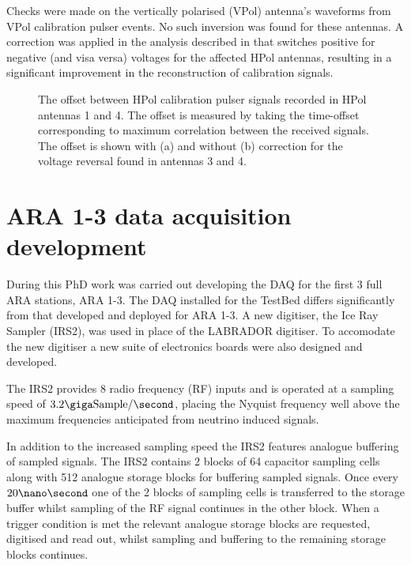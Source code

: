 Checks were made on the vertically polarised (VPol) antenna's waveforms from VPol calibration pulser events. No such inversion was found for these antennas. A correction was applied in the analysis described in  that switches positive for negative (and visa versa) voltages for the affected HPol antennas, resulting in a significant improvement in the reconstruction of calibration signals. 

\begin{figure}[htpb]
  \hfill
\caption{The offset between HPol calibration pulser signals recorded in HPol antennas 1 and 4. The offset is measured by taking the time-offset corresponding to maximum correlation between the received signals. The offset is shown with (a) and without (b) correction for the voltage reversal found in antennas 3 and 4.}
\label{fig:calibration:Voltage-Reversal-DeltaT}
\end{figure}



\section{ARA 1-3 data acquisition development}
\label{sec:calibration:ARA1-3-development}

During this PhD work was carried out developing the DAQ for the first 3 full ARA stations, ARA 1-3. The DAQ installed for the TestBed differs significantly from that developed and deployed for ARA 1-3. A new digitiser, the Ice Ray Sampler (IRS2), was used in place of the LABRADOR digitiser. To accomodate the new digitiser a new suite of electronics boards were also designed and developed. 


 The IRS2 provides 8 radio frequency (RF) inputs and is operated at a sampling speed of $3.2 \giga \mbox{Sample} /\second$, placing the Nyquist frequency well above the maximum frequencies anticipated from neutrino induced signals. 


In addition to the increased sampling speed the IRS2 features analogue buffering of sampled signals. The IRS2 contains 2 blocks of 64 capacitor sampling cells along with 512 analogue storage blocks for buffering sampled signals. Once every $20 \nano \second$ one of the 2 blocks of sampling cells is transferred to the storage buffer whilst sampling of the RF signal continues in the other block. When a trigger condition is met the relevant analogue storage blocks are requested, digitised and read out, whilst sampling and buffering to the remaining storage blocks continues. 


